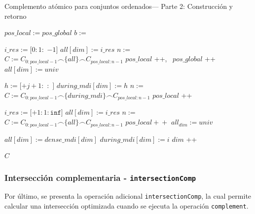 \begin{algorithm}
\caption{Complemento atómico para conjuntos ordenados— Parte 2: Construcción y retorno}\label{alg:complementAtom-part2}
\begin{algorithmic}[1]
    \State $pos\_local := pos\_global$
    \State $b :=$ 


      \State $i\_res := [0:1:$ $-1]$
        \State $all[dim] := i\_res$
        \State $n :=$ 
        \State $C := C_{0:pos\_local - 1} \frown \{all\} \frown C_{pos\_local:n - 1}$
        \State $pos\_local$ \!+\!+, \, $pos\_global$ \!+\!+
        \State $all[dim] := univ$
      \EndIf
    \EndIf

            \State $h := [$$ + j + 1 : $ $: $ $]$
              \State $during\_mdi[dim] := h$
              \State $n :=$ 
              \State $C := C_{0: pos\_local - 1} \frown \{during\_mdi\} \frown C_{pos\_local:n - 1}$
              \State $pos\_local$ \!+\!+
            \EndIf
          \EndFor
        \EndIf
    \EndIf

      \State $i\_res := [$$+1 : 1 : \texttt{inf}]$
        \State $all[dim] := i\_res$
        \State $n :=$ 
        \State $C := C_{0:pos\_local - 1} \frown \{all\} \frown C_{pos\_local:n - 1}$
        \State $pos\_local \!+\!+$
        \State $all_{dim} := univ$
      \EndIf
    \EndIf

    \State $all[dim] := dense\_mdi[dim]$
    \State $during\_mdi[dim] := i$
    \State $dim$ \!+\!+
  \EndFor

  \State \Return $C$
\EndFunction
\end{algorithmic}
\end{algorithm}


\newpage
\subsubsection{Intersección complementaria - \texttt{intersectionComp}}

Por último, se presenta la operación adicional \texttt{intersectionComp}, la cual permite calcular una intersección optimizada cuando se ejecuta la operación \texttt{complement}.

